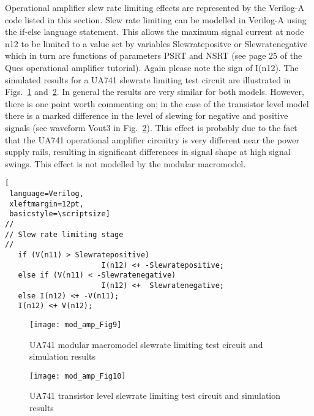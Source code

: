 Operational amplifier slew rate limiting effects are represented by
the Verilog-A code listed in this section.  Slew rate limiting can be
modelled in Verilog-A using the if-else language statement. This
allows the maximum signal current at node n12 to be limited to a value
set by variables Slewratepositve or Slewratenegative which in turn are
functions of parameters PSRT and NSRT (see page 25 of the Qucs
operational amplifier tutorial).  Again please note the sign of
I(n12).  The simulated results for a UA741 slewrate limiting test
circuit are illustrated in Figs.~\ref{fig:mod_amp9}
and~\ref{fig:mod_amp10}. In general the results are very similar for
both models. However, there is one point worth commenting on; in the
case of the transistor level model there is a marked difference in the
level of slewing for negative and positive signals (see waveform Vout3
in Fig.~\ref{fig:mod_amp10}). This effect is probably due to the fact
that the UA741 operational amplifier circuitry is very different near
the power supply rails, resulting in significant differences in signal
shape at high signal swings. This effect is not modelled by the
modular macromodel.

\begin{lstlisting}[
 language=Verilog, 
 xleftmargin=12pt,
 basicstyle=\scriptsize]
//
// Slew rate limiting stage
//
   if (V(n11) > Slewratepositive)
                      I(n12) <+ -Slewratepositive;
   else if (V(n11) < -Slewratenegative)
                      I(n12) <+  Slewratenegative;
   else I(n12) <+ -V(n11);
   I(n12) <+ V(n12);
\end{lstlisting}

\begin{figure} [h]
  \centering
  \texttt{[image: mod\_amp\_Fig9]}
  \caption{UA741 modular macromodel slewrate limiting test circuit and simulation results}
  \label{fig:mod_amp9}
\end{figure} 


\begin{figure} [h]
  \centering
  \texttt{[image: mod\_amp\_Fig10]}
  \caption{UA741 transistor level slewrate limiting test circuit and simulation results}
  \label{fig:mod_amp10}
\end{figure} 




